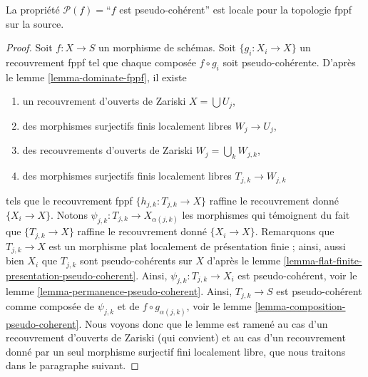 \begin{lemma}
\label{lemma-pseudo-coherent-fppf-local-source}
La propriété $\mathcal{P}(f) =$``$f$ est pseudo-cohérent''
est locale pour la topologie fppf sur la source.
\end{lemma}

\begin{proof}
Soit $f : X \to S$ un morphisme de schémas.
Soit $\{g_i : X_i \to X\}$ un recouvrement fppf tel que chaque composée
$f \circ g_i$ soit pseudo-cohérente. D'après le
lemme \ref{lemma-dominate-fppf},
il existe
\begin{enumerate}
\item un recouvrement d'ouverts de Zariski $X = \bigcup U_j$,
\item des morphismes surjectifs finis localement libres $W_j \to U_j$,
\item des recouvrements d'ouverts de Zariski $W_j = \bigcup_k W_{j, k}$,
\item des morphismes surjectifs finis localement libres $T_{j, k} \to W_{j, k}$
\end{enumerate}
tels que le recouvrement fppf $\{h_{j, k} : T_{j, k} \to X\}$ raffine le
recouvrement donné $\{X_i \to X\}$. Notons $\psi_{j, k} : T_{j, k} \to X_{\alpha(j, k)}$
les morphismes qui témoignent du fait que $\{T_{j, k} \to X\}$ raffine
le recouvrement donné $\{X_i \to X\}$. Remarquons que $T_{j, k} \to X$ est un morphisme plat
localement de présentation finie ; ainsi, aussi bien $X_i$ que $T_{j, k}$ sont
pseudo-cohérents sur $X$ d'après le
lemme \ref{lemma-flat-finite-presentation-pseudo-coherent}.
Ainsi, $\psi_{j, k} : T_{j, k} \to X_i$ est pseudo-cohérent, voir le
lemme \ref{lemma-permanence-pseudo-coherent}.
Ainsi, $T_{j, k} \to S$ est pseudo-cohérent comme composée
de $\psi_{j, k}$ et de $f \circ g_{\alpha(j, k)}$, voir le
lemme \ref{lemma-composition-pseudo-coherent}.
Nous voyons donc que le lemme est ramené au cas d'un recouvrement
d'ouverts de Zariski (qui convient) et au cas d'un recouvrement
donné par un seul morphisme surjectif fini localement libre, que nous
traitons dans le paragraphe suivant.


\end{proof}
